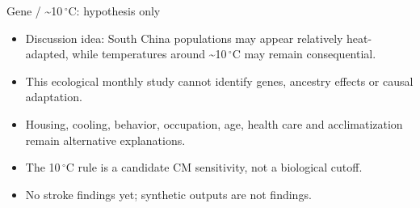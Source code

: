 \begin{frame}{Gene / \textasciitilde{}10\,$^\circ$C: hypothesis only}
  \footnotesize
  \begin{itemize}
    \item Discussion idea: South China populations may appear relatively heat-adapted,
      while temperatures around \textasciitilde{}10\,$^\circ$C may remain consequential.
    \item This ecological monthly study cannot identify genes, ancestry effects
      or causal adaptation.
    \item Housing, cooling, behavior, occupation, age, health care and acclimatization
      remain alternative explanations.
    \item The 10\,$^\circ$C rule is a candidate CM sensitivity, not a biological cutoff.
    \item No stroke findings yet; synthetic outputs are not findings.
  \end{itemize}

  \vspace{0.55em}
\end{frame}
